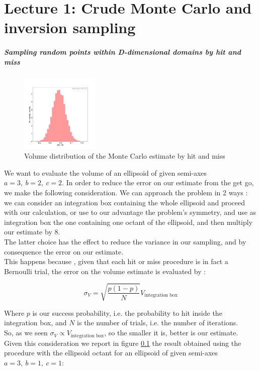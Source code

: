 \chapter*{Lecture 1: Crude Monte Carlo and inversion sampling}

\paragraph{Sampling random points within D-dimensional domains by hit and miss}


\begin{figure}
    \vspace{-25pt}
    \centering
    \includegraphics[width=0.33\textwidth]{FIG/exercise_0_images/first_ellipsoid_distribution.png}
  \caption{Volume distribution of the Monte Carlo estimate by hit and miss}
  \label{lec1:first_ellipsoid}
  \end{figure}

We want to evaluate the volume of an ellipsoid of given semi-axes $a=3,\ b=2,\ c=2$. 
In order to reduce the error on our estimate from the get go, we make the following consideration. We can approach the problem in 2 ways : 
we can consider an integration box containing the whole ellipsoid and proceed with our calculation, or use to our advantage the problem's symmetry, 
and use as integration box the one containing one octant of the ellipsoid, and then multiply our estimate by 8. \\
The latter choice has the effect to reduce the variance in our sampling, and by consequence the error on our estimate. \\
This happens because , given that each hit or miss procedure is in fact a Bernoulli trial, the error on the volume estimate is evaluated by :

$$ \sigma_V = \sqrt{\frac{p( 1-p )}{N}} V_{\text{integration box}} $$

Where $p$ is our success probability, i.e. the probability to hit inside the integration box, and $N$ is the number of trials, i.e. the number of iterations.\\
So, as we seen $\sigma_V \propto V_{\text{integration box}}$, so the smaller it is, better is our estimate. \\
Given this consideration we report in figure \ref{lec1:first_ellipsoid} the result obtained using the procedure with the ellipsoid octant for an ellipsoid of given semi-axes $a=3,\ b=1,\ c=1$:

